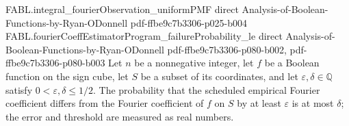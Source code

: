 \begin{theorem}
\proofstep
  {FABL.integral_fourierObservation_uniformPMF}
  {direct}
  {Analysis-of-Boolean-Functions-by-Ryan-ODonnell}
  {pdf-ffbe9c7b3306-p025-b004}
\proofstep
  {FABL.fourierCoeffEstimatorProgram_failureProbability_le}
  {direct}
  {Analysis-of-Boolean-Functions-by-Ryan-ODonnell}
  {pdf-ffbe9c7b3306-p080-b002,
    pdf-ffbe9c7b3306-p080-b003}
Let $n$ be a nonnegative integer, let $f$ be a Boolean function on the sign cube, let
$S$ be a subset of its coordinates, and let $\varepsilon,\delta\in\mathbb Q$ satisfy
$0<\varepsilon,\delta\le 1/2$. The probability that the scheduled empirical Fourier
coefficient differs from the Fourier coefficient of $f$ on $S$ by at least $\varepsilon$
is at most $\delta$; the error and threshold are measured as real numbers.
\end{theorem}
